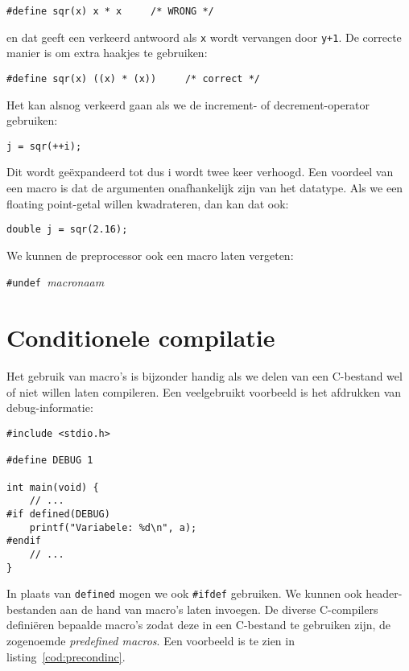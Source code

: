 \hspace*{1em}\texttt{\#define sqr(x) x * x \ \ \ \ /* WRONG */}

en dat geeft een verkeerd antwoord als \texttt{x} wordt vervangen door \texttt{y+1}. De correcte manier is om extra haakjes te gebruiken:

\hspace*{1em}\texttt{\#define sqr(x) ((x) * (x)) \ \ \ \ /* correct */}

Het kan alsnog verkeerd gaan als we de increment- of decrement-operator gebruiken:

\hspace*{1em}\texttt{j = sqr(++i);}

Dit wordt geëxpandeerd tot   dus i wordt twee keer verhoogd.
Een voordeel van een macro is dat de argumenten onafhankelijk zijn van het datatype. Als we een floating point-getal willen kwadrateren, dan kan dat ook:

\hspace*{1em}\texttt{double j = sqr(2.16);}

We kunnen de preprocessor ook een macro laten vergeten:

\hspace*{1em}\texttt{\#undef }\textsl{macronaam}


\section{Conditionele compilatie}
Het gebruik van macro's is bijzonder handig als we delen van een C-bestand wel of niet willen laten compileren. Een veelgebruikt voorbeeld is het afdrukken van debug-informatie:

\begin{lstlisting}[caption=Conditionele compilatie.]
#include <stdio.h>

#define DEBUG 1

int main(void) {
    // ...
#if defined(DEBUG)
    printf("Variabele: %d\n", a);
#endif
    // ...
}
\end{lstlisting}

In plaats van \texttt{defined} mogen we ook \texttt{\#ifdef} gebruiken. We kunnen ook header-bestanden aan de hand van macro's laten invoegen. De diverse C-compilers definiëren bepaalde macro's zodat deze in een C-bestand te gebruiken zijn, de zogenoemde \textsl{predefined macros}. Een voorbeeld is te zien in listing~\ref{cod:precondinc}.

